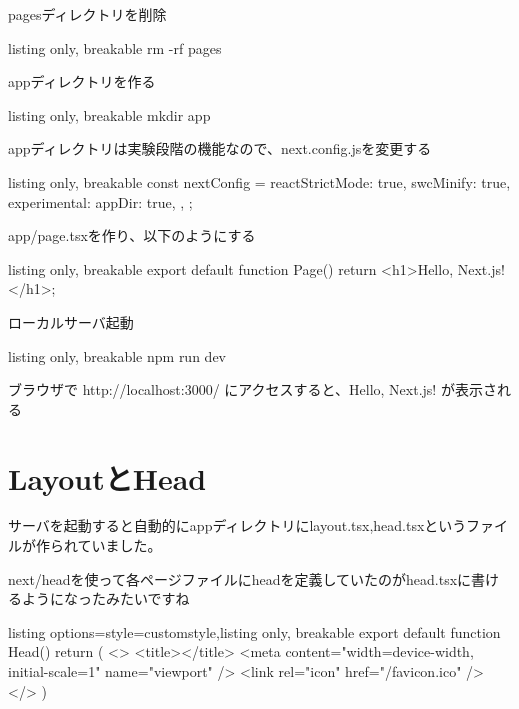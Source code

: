 pagesディレクトリを削除
\begin{tcblisting}{listing only, breakable}
  rm -rf pages
\end{tcblisting}

appディレクトリを作る
\begin{tcblisting}{listing only, breakable}
  mkdir app
\end{tcblisting}


appディレクトリは実験段階の機能なので、next.config.jsを変更する

\begin{tcblisting}{listing only, breakable}
  const nextConfig = {
  reactStrictMode: true,
  swcMinify: true,
  experimental: {
  appDir: true,
  },
  };
\end{tcblisting}

app/page.tsxを作り、以下のようにする



\begin{tcblisting}{listing only, breakable}
  export default function Page() {
      return <h1>Hello, Next.js!</h1>;
    }
\end{tcblisting}




ローカルサーバ起動


\begin{tcblisting}{listing only, breakable}
  npm run dev
\end{tcblisting}



ブラウザで http://localhost:3000/ にアクセスすると、Hello, Next.js! が表示される




\section{LayoutとHead
 }

サーバを起動すると自動的にappディレクトリにlayout.tsx,head.tsxというファイルが作られていました。

next/headを使って各ページファイルにheadを定義していたのがhead.tsxに書けるようになったみたいですね

\begin{tcblisting}{listing options={style=customstyle},listing only, breakable}
  export default function Head() {
      return (
      <>
      <title></title>
      <meta content="width=device-width, initial-scale=1" name="viewport" />
      <link rel="icon" href="/favicon.ico" />
      </>
      )
    }
\end{tcblisting}



